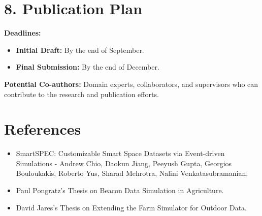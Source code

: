 \documentclass[12pt]{article}
\begin{document}

\section*{8. Publication Plan}

\textbf{Deadlines:}
\begin{itemize}
    \item \textbf{Initial Draft:} By the end of September.
    \item \textbf{Final Submission:} By the end of December.
\end{itemize}

\textbf{Potential Co-authors:} Domain experts, collaborators, and supervisors who can contribute to the research and publication efforts.

\section*{References}
\begin{itemize}
    \item SmartSPEC: Customizable Smart Space Datasets via Event-driven Simulations - Andrew Chio, Daokun Jiang, Peeyush Gupta, Georgios Bouloukakis, Roberto Yus, Sharad Mehrotra, Nalini Venkatasubramanian.
    \item Paul Pongratz's Thesis on Beacon Data Simulation in Agriculture.
    \item David Jares's Thesis on Extending the Farm Simulator for Outdoor Data.
\end{itemize}
\end{document}
